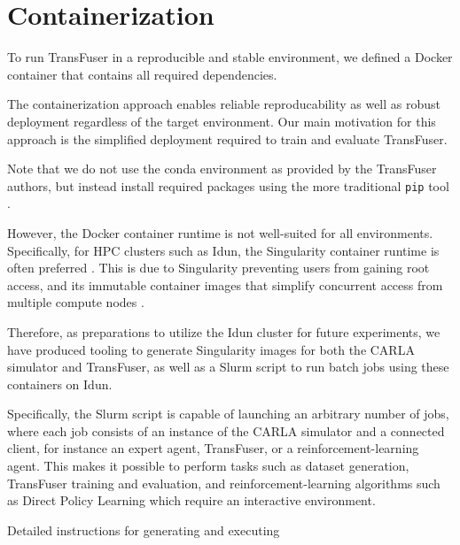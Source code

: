 \newpage
\section{Containerization}
\label{sec:containerization}

To run TransFuser in a reproducible and stable environment,
we defined a Docker container \cite{software:docker}
that contains all required dependencies.

The containerization approach enables reliable reproducability
as well as robust deployment regardless of the target environment.
Our main motivation for this approach is the simplified deployment
required to train and evaluate TransFuser.

Note that we do not use the conda \cite{software:conda} environment
as provided by the TransFuser authors,
but instead install required packages
using the more traditional \texttt{pip} tool \cite{software:pip}.

However, the Docker container runtime is not well-suited for all environments.
Specifically, for HPC clusters such as Idun,
the Singularity container runtime \cite{software:singularity} is often preferred \cite{princeton:singularity}.
This is due to Singularity preventing users from gaining root access, 
and its immutable container images that simplify concurrent access from multiple compute nodes .

Therefore, as preparations to utilize the Idun cluster for future experiments,
we have produced tooling to generate Singularity images for both the CARLA simulator and TransFuser,
as well as a Slurm script to run batch jobs using these containers on Idun.

Specifically, the Slurm script is capable of launching an arbitrary number of jobs,
where each job consists of an instance of the CARLA simulator and a connected client, for instance an expert agent, TransFuser, or a reinforcement-learning agent.
This makes it possible to perform tasks such as
dataset generation,
TransFuser training and evaluation,
and reinforcement-learning algorithms such as Direct Policy Learning which require an interactive environment.

Detailed instructions for generating and executing 